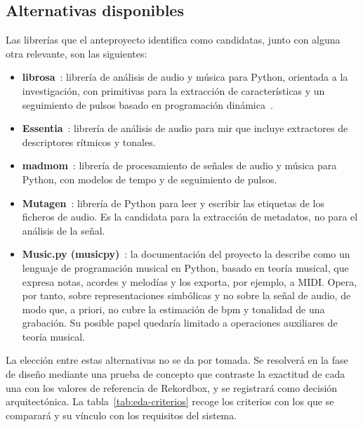 \subsection{Alternativas disponibles}

Las librerías que el anteproyecto identifica como candidatas, junto con alguna otra relevante, son las siguientes:

\begin{itemize}
  \item \textbf{librosa}~\cite{mcfee2015librosa}: librería de análisis de audio y música para Python, orientada a la investigación, con primitivas para la extracción de características y un seguimiento de pulsos basado en programación dinámica~\cite{ellis2007beat}.
  \item \textbf{Essentia}~\cite{bogdanov2013essentia}: librería de análisis de audio para \acs{mir} que incluye extractores de descriptores rítmicos y tonales.
  \item \textbf{madmom}~\cite{bock2016madmom}: librería de procesamiento de señales de audio y música para Python, con modelos de tempo y de seguimiento de pulsos.
  \item \textbf{Mutagen}~\cite{mutagen}: librería de Python para leer y escribir las etiquetas de los ficheros de audio. Es la candidata para la extracción de metadatos, no para el análisis de la señal.
  \item \textbf{Music.py (musicpy)}~\cite{musicpy}: la documentación del proyecto la describe como un lenguaje de programación musical en Python, basado en teoría musical, que expresa notas, acordes y melodías y los exporta, por ejemplo, a MIDI. Opera, por tanto, sobre representaciones simbólicas y no sobre la señal de audio, de modo que, a priori, no cubre la estimación de \acs{bpm} y tonalidad de una grabación. Su posible papel quedaría limitado a operaciones auxiliares de teoría musical.
\end{itemize}

La elección entre estas alternativas no se da por tomada. Se resolverá en la fase de diseño mediante una prueba de concepto que contraste la exactitud de cada una con los valores de referencia de Rekordbox, y se registrará como decisión arquitectónica. La tabla~\ref{tab:eda-criterios} recoge los criterios con los que se comparará y su vínculo con los requisitos del sistema.

